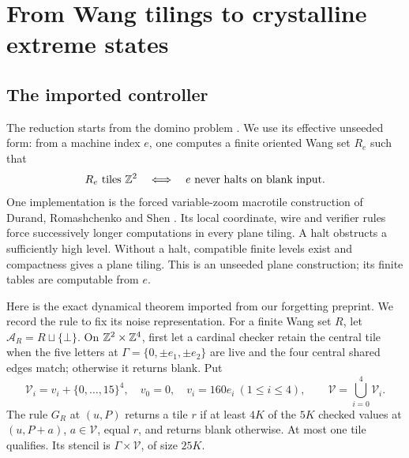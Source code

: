 \section{From Wang tilings to crystalline extreme states}\label{sec:controller}
\subsection{The imported controller}
The reduction starts from the domino problem \cite{berger,robinson}. We use its effective unseeded form: from a machine index $e$, one computes a finite oriented Wang set $R_e$ such that
\begin{equation}\label{eq:wang-reduction}
 R_e\text{ tiles }\mathbb Z^2\quad\Longleftrightarrow\quad e\text{ never halts on blank input}.
\end{equation}
One implementation is the forced variable-zoom macrotile construction of Durand, Romashchenko and Shen \cite[Sections~2.2--2.3 and~5]{DRS}. Its local coordinate, wire and verifier rules force successively longer computations in every plane tiling. A halt obstructs a sufficiently high level. Without a halt, compatible finite levels exist and compactness gives a plane tiling. This is an unseeded plane construction; its finite tables are computable from $e$.

Here is the exact dynamical theorem imported from our forgetting preprint. We record the rule to fix its noise representation. For a finite Wang set $R$, let $\mathcal A_R=R\sqcup\{\bot\}$. On $\mathbb Z^2\times\mathbb Z^4$, first let a cardinal checker retain the central tile when the five letters at $\Gamma=\{0,\pm e_1,\pm e_2\}$ are live and the four central shared edges match; otherwise it returns blank. Put
\[
 \mathcal V_i=v_i+\{0,\ldots,15\}^4,\quad v_0=0,\quad v_i=160e_i\ (1\le i\le4),
 \qquad \mathcal V=\bigcup_{i=0}^4\mathcal V_i.
\]
The rule $G_R$ at $(u,P)$ returns a tile $r$ if at least $4K$ of the $5K$ checked values at $(u,P+a)$, $a\in\mathcal V$, equal $r$, and returns blank otherwise. At most one tile qualifies. Its stencil is $\Gamma\times\mathcal V$, of size $25K$.

